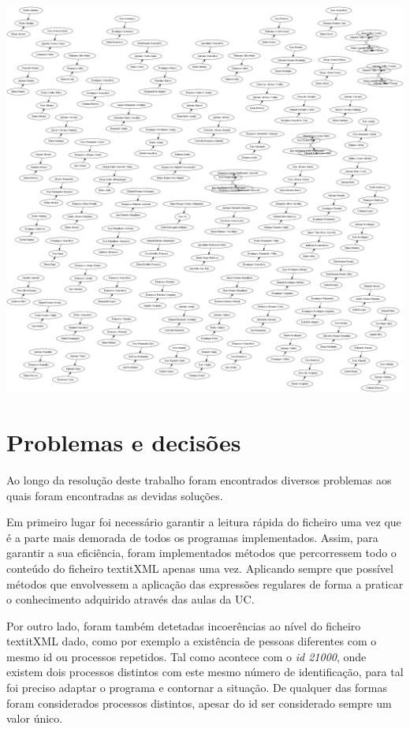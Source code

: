 \documentclass[11pt,a4paper]{report}
\begin{document}
\begin{center}
	\includegraphics[scale=0.15]{images/e2}
	\end{center}

\newpage
\section{Problemas e decisões}

\qquad Ao longo da resolução deste trabalho foram encontrados diversos problemas aos quais foram encontradas as devidas soluções. \par
\qquad Em primeiro lugar foi necessário garantir a leitura rápida do ficheiro uma vez que é a parte mais demorada de todos os programas implementados. Assim, para garantir a sua eficiência, foram implementados métodos que percorressem todo o conteúdo do ficheiro textit{XML} apenas uma vez. Aplicando sempre que possível métodos que envolvessem a aplicação das expressões regulares de forma a praticar o conhecimento adquirido através das aulas da UC.\par
\qquad Por outro lado, foram também detetadas incoerências ao nível do ficheiro textit{XML} dado, como por exemplo a existência de pessoas diferentes com o mesmo id ou processos repetidos. Tal como acontece com o \textit{id 21000}, onde existem dois processos distintos com este mesmo número de identificação, para tal foi preciso adaptar o programa e contornar a situação. De qualquer das formas foram considerados processos distintos, apesar do id ser considerado sempre um valor único. 
	  
\end{document}
